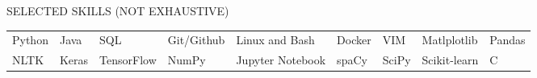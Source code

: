\documentclass{resume} %
\begin{document}
\begin{rSection}{SELECTED SKILLS (NOT EXHAUSTIVE)}
\vspace{-0.2cm}
\begin{table}[!ht]
\begin{tabular}{lllllllll}
Python & Java & SQL & Git/Github  & Linux and Bash       & Docker  &  VIM   & Matlplotlib & Pandas    \\
NLTK   & Keras & TensorFlow &    NumPy      &  Jupyter Notebook    & spaCy           &    SciPy   & Scikit-learn  & C       
\end{tabular}
\end{table}
\vspace{-0.6cm}

\vspace{-0.2cm}
\end{rSection}
\end{document}
